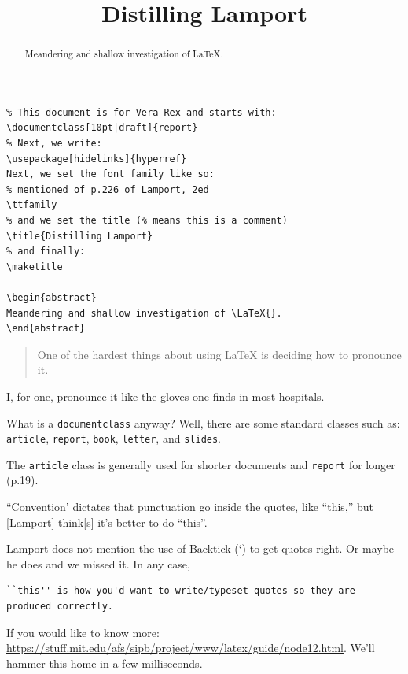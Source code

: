 \documentclass[10pt|draft]{report}
\title{Distilling Lamport}
\begin{document}
\begin{verbatim}
% This document is for Vera Rex and starts with:
\documentclass[10pt|draft]{report}
% Next, we write:
\usepackage[hidelinks]{hyperref}
Next, we set the font family like so:
% mentioned of p.226 of Lamport, 2ed
\ttfamily
% and we set the title (% means this is a comment)
\title{Distilling Lamport}
% and finally:
\maketitle

\begin{abstract}
Meandering and shallow investigation of \LaTeX{}.
\end{abstract}
\end{verbatim}

\maketitle

\begin{abstract}
Meandering and shallow investigation of \LaTeX{}.
\end{abstract}

\begin{quote}
One of the hardest things about using \LaTeX{} is deciding how to pronounce it.
\end{quote}

I, for one, pronounce it like the gloves one finds in most hospitals.

What is a \verb|documentclass| anyway? Well, there are some standard classes such as: \verb|article|, \verb|report|, \verb|book|, \verb|letter|, and \verb|slides|.

The \verb|article| class is generally used for shorter documents and \verb|report| for longer (p.19).

``Convention' dictates that punctuation go inside the quotes, like ``this,'' but [Lamport] think[s] it's better to do ``this''.

Lamport does not mention the use of Backtick (`) to get quotes right. Or maybe he does and we missed it. In any case,

\begin{verbatim}
``this'' is how you'd want to write/typeset quotes so they are produced correctly.
\end{verbatim}

If you would like to know more: \url{https://stuff.mit.edu/afs/sipb/project/www/latex/guide/node12.html}. We'll hammer this home in a few milliseconds.
\end{document}
